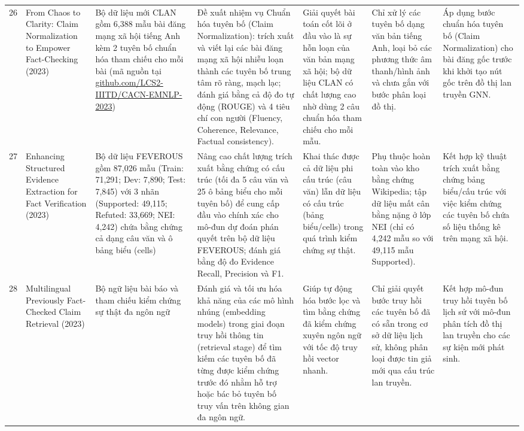 \documentclass[11pt,a4paper]{extreport}
\begin{document}
\begin{landscape}
\begin{longtable}{@{}C{0.6cm}p{3.6cm}p{2.7cm}p{4.8cm}p{3.6cm}p{3.6cm}p{3.6cm}@{}}
26 & From Chaos to Clarity: Claim Normalization to Empower Fact-Checking (2023) \cite{noauthor_chaos_2023} & Bộ dữ liệu mới CLAN gồm 6,388 mẫu bài đăng mạng xã hội tiếng Anh kèm 2 tuyên bố chuẩn hóa tham chiếu cho mỗi bài (mã nguồn tại \url{github.com/LCS2-IIITD/CACN-EMNLP-2023}) & Đề xuất nhiệm vụ Chuẩn hóa tuyên bố (Claim Normalization): trích xuất và viết lại các bài đăng mạng xã hội nhiễu loạn thành các tuyên bố trung tâm rõ ràng, mạch lạc; đánh giá bằng cả độ đo tự động (ROUGE) và 4 tiêu chí con người (Fluency, Coherence, Relevance, Factual consistency). & Giải quyết bài toán cốt lõi ở đầu vào là sự hỗn loạn của văn bản mạng xã hội; bộ dữ liệu CLAN có chất lượng cao nhờ dùng 2 câu chuẩn hóa tham chiếu cho mỗi mẫu. & Chỉ xử lý các tuyên bố dạng văn bản tiếng Anh, loại bỏ các phương thức âm thanh/hình ảnh và chưa gắn với bước phân loại đồ thị. & Áp dụng bước chuẩn hóa tuyên bố (Claim Normalization) cho bài đăng gốc trước khi khởi tạo nút gốc trên đồ thị lan truyền GNN. \\ 

27 & Enhancing Structured Evidence Extraction for Fact Verification (2023) \cite{noauthor_enhancing_2023} & Bộ dữ liệu FEVEROUS gồm 87,026 mẫu (Train: 71,291; Dev: 7,890; Test: 7,845) với 3 nhãn (Supported: 49,115; Refuted: 33,669; NEI: 4,242) chứa bằng chứng cả dạng câu văn và ô bảng biểu (cells) & Nâng cao chất lượng trích xuất bằng chứng có cấu trúc (tối đa 5 câu văn và 25 ô bảng biểu cho mỗi tuyên bố) để cung cấp đầu vào chính xác cho mô-đun dự đoán phán quyết trên bộ dữ liệu FEVEROUS; đánh giá bằng độ đo Evidence Recall, Precision và F1. & Khai thác được cả dữ liệu phi cấu trúc (câu văn) lẫn dữ liệu có cấu trúc (bảng biểu/cells) trong quá trình kiểm chứng sự thật. & Phụ thuộc hoàn toàn vào kho bằng chứng Wikipedia; tập dữ liệu mất cân bằng nặng ở lớp NEI (chỉ có 4,242 mẫu so với 49,115 mẫu Supported). & Kết hợp kỹ thuật trích xuất bằng chứng bảng biểu/cấu trúc với việc kiểm chứng các tuyên bố chứa số liệu thống kê trên mạng xã hội. \\ 

28 & Multilingual Previously Fact-Checked Claim Retrieval (2023) \cite{noauthor_multilingual_2023} & Bộ ngữ liệu bài báo và tham chiếu kiểm chứng sự thật đa ngôn ngữ & Đánh giá và tối ưu hóa khả năng của các mô hình nhúng (embedding models) trong giai đoạn truy hồi thông tin (retrieval stage) để tìm kiếm các tuyên bố đã từng được kiểm chứng trước đó nhằm hỗ trợ hoặc bác bỏ tuyên bố truy vấn trên không gian đa ngôn ngữ. & Giúp tự động hóa bước lọc và tìm bằng chứng đã kiểm chứng xuyên ngôn ngữ với tốc độ truy hồi vector nhanh. & Chỉ giải quyết bước truy hồi các tuyên bố đã có sẵn trong cơ sở dữ liệu lịch sử, không phân loại được tin giả mới qua cấu trúc lan truyền. & Kết hợp mô-đun truy hồi tuyên bố lịch sử với mô-đun phân tích đồ thị lan truyền cho các sự kiện mới phát sinh. \\ 


\end{longtable}
\end{landscape}
\end{document}
